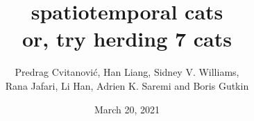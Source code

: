 


\title{ 			spatiotemporal cats
       \\ \Huge 	or, try herding 7 cats
        \\\vspace{1.0cm}
        }\author{
        Predrag Cvitanovi\'{c},
        Han Liang,
        Sidney V. Williams,
    \\
        Rana Jafari,
        Li Han,
		Adrien K. Saremi
         and
        Boris Gutkin
        }

        \date{March 20, 2021} \Private{\date{\today}}
